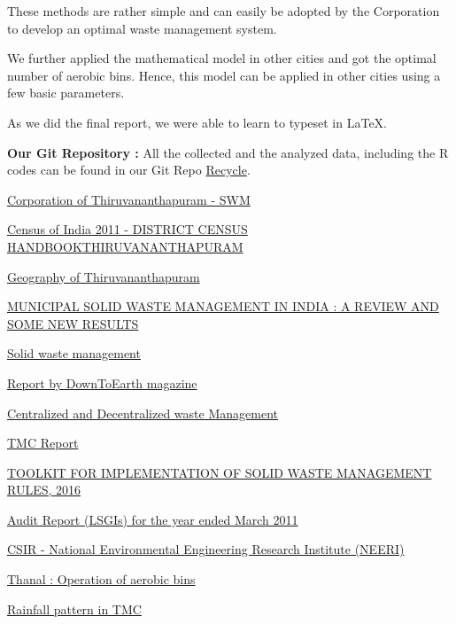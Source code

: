 \documentclass[12pt,a4paper]{report}
\begin{document}
These methods are rather simple and can easily be adopted by the Corporation to develop an optimal waste management system.

We further applied the mathematical model in other cities and got the optimal number of aerobic bins. Hence, this model can be applied in other cities using a few basic parameters. 

As we did the final report, we were able to learn to typeset in \LaTeX.

\textbf{Our Git Repository :} All the collected and the analyzed data, including the R codes can be found in our Git Repo \href{https://github.com/sahridhaya/Recycle}{Recycle}.

\begin{thebibliography}{}
	
\href{http://www.corporationoftrivandrum.in/solid-waste-management-0}{Corporation of Thiruvananthapuram - SWM}

 \href{http://censusindia.gov.in/2011census/dchb/3214_PART_B_THIRUVANANTHAPURAM.pdf}{Census of India 2011 - DISTRICT CENSUS HANDBOOKTHIRUVANANTHAPURAM}	

\href{https://en.wikipedia.org/wiki/Geography_of_Thiruvananthapuram}{Geography of Thiruvananthapuram}

 \href{https://www.researchgate.net/publication/260230170_MUNICIPAL_SOLID_WASTE_MANAGEMENT_IN_INDIA_A_REVIEW_AND_SOME_NEW_RESULTS}{MUNICIPAL SOLID WASTE MANAGEMENT IN INDIA : A REVIEW AND SOME NEW RESULTS} 

 \href{https://www.cag.org.in/blogs/solid-waste-management-dummies}{Solid waste management}

 \href{https://www.downtoearth.org.in/blog/waste/india-s-challenges-in-waste-management-56753}{Report by DownToEarth magazine}

 \href{https://www.cag.org.in/database/centralised-and-decentralised-waste-management}{Centralized and Decentralized waste Management }

 \href{http://www.corporationoftrivandrum.in/sites/default/files/Rating\%20report-TVM.pdf}{TMC Report}

\href{http://www.npcindia.gov.in/wp-content/uploads/2017/11/Guidelines-of-implementation-for-SWM-Rules-2016.pdf}{TOOLKIT FOR IMPLEMENTATION OF SOLID WASTE MANAGEMENT RULES, 2016}

\href{https://www.agker.cag.gov.in/images/LSG2011/chiiib.pdf}{Audit Report (LSGIs) for the year ended March 2011}

\href{http://www.neeri.res.in/content/annual-reports-0}{CSIR - National Environmental Engineering Research Institute (NEERI)}

\href{http://thanal.co.in/uploads/resource/document/standard-operating-procedure-of-community-aerobic-composting-bins-thumburmoozhi-model-44732514.pdf}{Thanal : Operation of aerobic bins}

\href{http://www.kerala.climatemps.com/}{Rainfall pattern in TMC}

\end{thebibliography}
\end{document}
